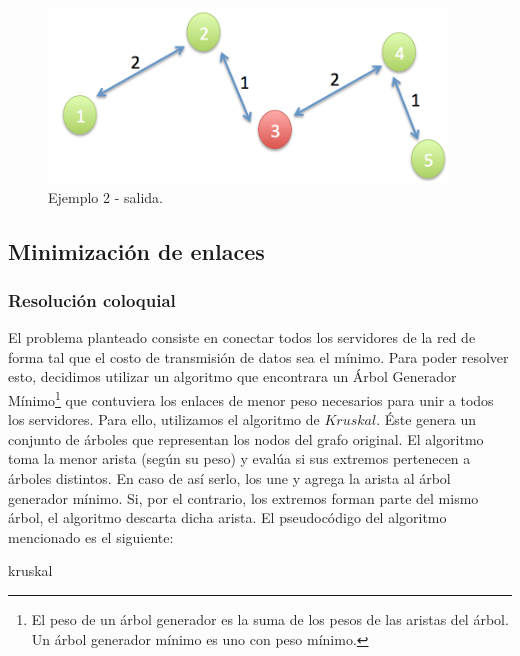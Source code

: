 \begin{itemize}
\begin{figure}[H] %
\begin{center}
\includegraphics[width=300pt]{../imgs/ejemplo2ej2sal.jpg}
\caption{Ejemplo 2 - salida.}
\end{center}
\end{figure}

\subsection{Minimización de enlaces}
\subsubsection{Resolución coloquial}

 El problema planteado consiste en conectar todos los servidores de la red de forma tal que el costo de transmisión de datos sea el mínimo. Para poder resolver esto, decidimos utilizar un algoritmo que encontrara un Árbol Generador Mínimo\footnote{El peso de un árbol generador es la suma de los pesos de las aristas del árbol. Un árbol generador mínimo es uno con peso mínimo.} que contuviera los enlaces de menor peso necesarios para unir a todos los servidores. Para ello, utilizamos el algoritmo de $Kruskal$. Éste genera un conjunto de árboles que representan los nodos del grafo original. El algoritmo toma la menor arista (según su peso) y evalúa si sus extremos pertenecen a árboles distintos. En caso de así serlo, los une y agrega la arista al árbol generador mínimo. Si, por el contrario, los extremos forman parte del mismo árbol, el algoritmo descarta dicha arista.\newline
\newline
El pseudocódigo del algoritmo mencionado es el siguiente: \newline
\newline

\begin{algorithm}[H]
	\SetAlgoLined
	\caption{kruskal}
    

\end{algorithm}
\end{itemize}

